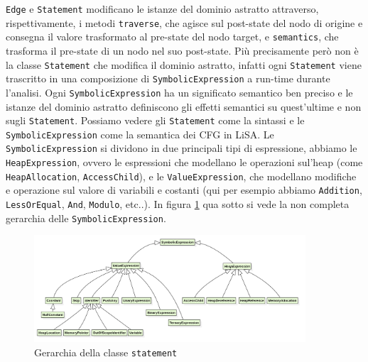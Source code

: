 \texttt{Edge} e \texttt{Statement} modificano le istanze del dominio astratto attraverso, rispettivamente, i metodi \texttt{traverse}, che agisce sul post-state del nodo di origine e consegna il valore trasformato al pre-state del nodo target, e \texttt{semantics}, che trasforma il pre-state di un nodo nel suo post-state. Più precisamente però non è la classe \texttt{Statement} che modifica il dominio astratto, infatti ogni \texttt{Statement} viene trascritto in una composizione di \texttt{SymbolicExpression} a run-time durante l'analisi. Ogni \texttt{SymbolicExpression} ha un significato semantico ben preciso e le istanze del dominio astratto definiscono gli effetti semantici su quest'ultime e non sugli \texttt{Statement}. Possiamo vedere gli \texttt{Statement} come la sintassi e le \texttt{SymbolicExpression} come la semantica dei CFG in LiSA. Le \texttt{SymbolicExpression} si dividono in due principali tipi di espressione, abbiamo le \texttt{HeapExpression}, ovvero le espressioni che modellano le operazioni sul'heap (come \texttt{HeapAllocation}, \texttt{AccessChild}), e le \texttt{ValueExpression}, che modellano modifiche e operazione sul valore di variabili e costanti (qui per esempio abbiamo \texttt{Addition}, \texttt{LessOrEqual}, \texttt{And}, \texttt{Modulo}, etc..). In figura \ref{fig:gerarchiaSymbolic} qua sotto si vede la non completa gerarchia delle \texttt{SymbolicExpression}.

\begin{figure}[ht]
	\centering
	\includegraphics[width=0.9\textwidth]{Immagini/gerarchiaSymbolicExpression.png}
	\caption{Gerarchia della classe \texttt{statement}}
	\label{fig:gerarchiaSymbolic}
\end{figure}


